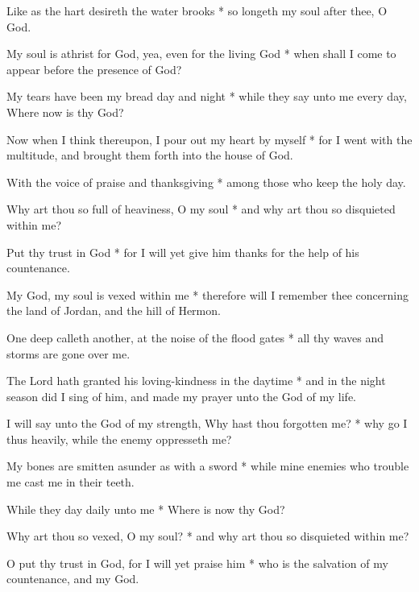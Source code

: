 Like as the hart desireth the water brooks * so longeth my soul after thee, O God.

My soul is athrist for God, yea, even for the living God * when shall I come to appear before the presence of God?

My tears have been my bread day and night * while they say unto me every day, Where now is thy God?

Now when I think thereupon, I pour out my heart by myself * for I went with the multitude, and brought them forth into the house of God.

With the voice of praise and thanksgiving * among those who keep the holy day.

Why art thou so full of heaviness, O my soul * and why art thou so disquieted within me?

Put thy trust in God * for I will yet give him thanks for the help of his countenance.

My God, my soul is vexed within me * therefore will I remember thee concerning the land of Jordan, and the hill of Hermon.

One deep calleth another, at the noise of the flood gates * all thy waves and storms are gone over me.

The Lord hath granted his loving-kindness in the daytime * and in the night season did I sing of him, and made my prayer unto the God of my life.

I will say unto the God of my strength, Why hast thou forgotten me? * why go I thus heavily, while the enemy oppresseth me?

My bones are smitten asunder as with a sword * while mine enemies who trouble me cast me in their teeth.

While they day daily unto me * Where is now thy God?

Why art thou so vexed, O my soul? * and why art thou so disquieted within me?

O put thy trust in God, for I will yet praise him * who is the salvation of my countenance, and my God.